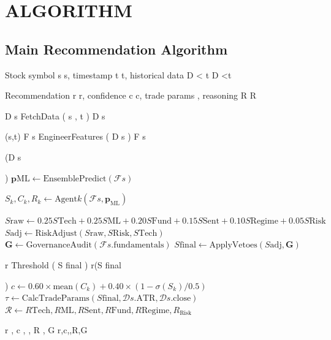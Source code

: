 \documentclass[12pt,a4paper]{report}
\begin{document}
\chapter{ALGORITHM}

\section{Main Recommendation Algorithm}
\begin{algorithm}[H]
\caption{Multi-Agent Stock Recommendation}
\label{alg:main}
\begin{algorithmic}[1]
\REQUIRE Stock symbol 
s
s, timestamp 
t
t, historical data 
D
<
t
D 
<t

 
\ENSURE Recommendation 
r
r, confidence 
c
c, trade params 
\tau
\tau, reasoning 
R
R

\STATE 
D
s
\gets
FetchData
(
s
,
t
)
D 
s

 \getsFetchData(s,t) 
\STATE 
F
s
\gets
EngineerFeatures
(
D
s
)
F 
s

 \getsEngineerFeatures(D 
s

 ) 
\STATE $\mathbf{p}{\text{ML}} \gets \text{EnsemblePredict}(\mathcal{F}s)$ 

\STATE $S_k, C_k, R_k \gets \text{Agent}k(\mathcal{F}s, \mathbf{p}_{\text{ML}})$
\ENDFOR

\STATE $S{\text{raw}} \gets 0.25 S{\text{Tech}} + 0.25 S{\text{ML}} + 0.20 S{\text{Fund}} + 0.15 S{\text{Sent}} + 0.10 S{\text{Regime}} + 0.05 S{\text{Risk}}$
\STATE $S{\text{adj}} \gets \text{RiskAdjust}(S{\text{raw}}, S{\text{Risk}}, S{\text{Tech}})$
\STATE $\mathbf{G} \gets \text{GovernanceAudit}(\mathcal{F}s.\text{fundamentals})$
\STATE $S{\text{final}} \gets \text{ApplyVetoes}(S{\text{adj}}, \mathbf{G})$

\STATE 
r
\gets
Threshold
(
S
final
)
r\getsThreshold(S 
final

 ) 
\STATE $c \gets 0.60 \times \text{mean}(C_k) + 0.40 \times (1 - \sigma(S_k)/0.5)$
\STATE $\tau \gets \text{CalcTradeParams}(S{\text{final}}, \mathcal{D}s.\text{ATR}, \mathcal{D}s.\text{close})$
\STATE $\mathcal{R} \gets {R{\text{Tech}}, R{\text{ML}}, R{\text{Sent}}, R{\text{Fund}}, R{\text{Regime}}, R_{\text{Risk}}}$

\RETURN 
r
,
c
,
\tau
,
R
,
G
r,c,\tau,R,G
\end{algorithmic}
\end{algorithm}
\end{document}
